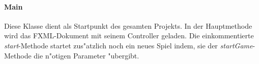 \paragraph{Main}
\label{par:main}
Diese Klasse dient als Startpunkt des gesamten Projekts. In der Hauptmethode wird das FXML-Dokument mit seinem Controller geladen. Die einkommentierte \emph{start}-Methode startet zus"atzlich noch ein neues Spiel indem, sie der \emph{startGame}-Methode die n"otigen Parameter "ubergibt. 
